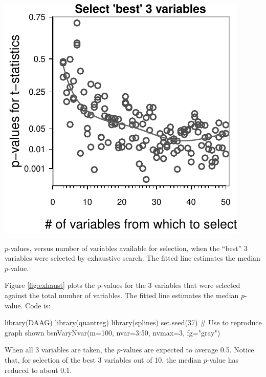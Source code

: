 \documentclass{tufte-book}\usepackage[]{graphicx}\usepackage[]{color}
\begin{document}
\begin{marginfigure}
\begin{Schunk}


\centerline{\includegraphics[width=\textwidth]{figs/8-bsnVary-1} }

\end{Schunk}
\caption{$p$-values, versus number of variables available for selection,
  when the ``best'' 3 variables were selected by exhaustive search.
  The fitted line estimates the median $p$-value.\label{fig:exhaust}}
\end{marginfigure}
\noindent

Figure \ref{fig:exhaust} plots the p-values for the 3 variables that
were selected against the total number of variables. The fitted line
estimates the median $p$-value.
Code is:
\begin{Schunk}
\begin{Sinput}
library(DAAG)
library(quantreg)
library(splines)
set.seed(37)   # Use to reproduce graph shown
bsnVaryNvar(m=100, nvar=3:50, nvmax=3, fg="gray")
\end{Sinput}
\end{Schunk}

When all 3 variables are taken, the $p$-values are expected to average
0.5.  Notice that, for selection of the best 3 variables out of 10,
the median $p$-value has reduced to about 0.1.
\end{document}

